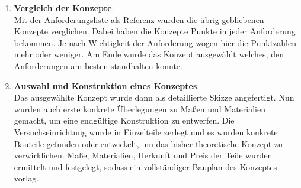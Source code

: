 \begin{enumerate}
\item \textbf{Vergleich der Konzepte}:\\
Mit der Anforderungsliste als Referenz wurden die \"{u}brig gebliebenen Konzepte verglichen. Dabei haben die Konzepte Punkte in jeder Anforderung bekommen. Je nach Wichtigkeit der Anforderung wogen hier die Punktzahlen mehr oder weniger. Am Ende wurde das Konzept ausgew\"{a}hlt welches, den Anforderungen am besten standhalten konnte.
\item \textbf{Auswahl und Konstruktion eines Konzeptes}:\\
Das ausgew\"{a}hlte Konzept wurde dann als detaillierte Skizze angefertigt. Nun wurden auch erste konkrete \"{U}berlegungen zu Ma{\ss}en und Materialien gemacht, um eine endg\"{u}ltige Konstruktion zu entwerfen. Die Versuchseinrichtung wurde in Einzelteile zerlegt und es wurden konkrete Bauteile gefunden oder entwickelt, um das bisher theoretische Konzept zu verwirklichen. Ma{\ss}e, Materialien, Herkunft und Preis der Teile wurden ermittelt und festgelegt, sodass ein vollst\"{a}ndiger Bauplan des Konzeptes vorlag.
\end{enumerate}